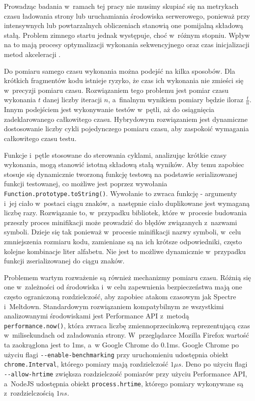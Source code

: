 Prowadząc badania w~ramach tej pracy nie musimy skupiać się na metrykach czasu ładowania strony lub uruchamiania środowiska serwerowego, ponieważ przy intensywnych lub powtarzalnych obliczeniach stanowią one pomijalną składową stałą.
Problem zimnego startu jednak występuje, choć w~różnym stopniu. Wpływ na to mają procesy optymalizacji wykonania sekwencyjnego oraz czas inicjalizacji metod akceleracji \cite{je-benchmarking}.

Do pomiaru samego czasu wykonania można podejść na kilka sposobów. Dla krótkich fragmentów kodu istnieje ryzyko, że czas ich wykonania nie zmieści się w~precyzji pomiaru czasu. Rozwiązaniem tego problemu jest pomiar czasu wykonania $t$ danej liczby iteracji $n$, a~finalnym wynikiem pomiary będzie iloraz $\frac{t}{n}$. Innym podejściem jest wykonywanie testów w~pętli, aż do osiągnięcia zadeklarowanego całkowitego czasu. Hybrydowym rozwiązaniem jest dynamiczne dostosowanie liczby cykli pojedynczego pomiaru czasu, aby zaspokoić wymagania całkowitego czasu testu.

Funkcje i~pętle stosowane do sterowania cyklami, analizując krótkie czasy wykonania, mogą stanowić istotną składową stałą wyników. Aby temu zapobiec stosuje się dynamicznie tworzoną funkcję testową na podstawie serializowanej funkcji testowanej, co możliwe jest poprzez wywołania \lstinline{Function.prototype.toString()}. Wywołanie to zwraca funkcję - argumenty i~jej ciało w~postaci ciągu znaków, a~następnie ciało duplikowane jest wymaganą liczbę razy. Rozwiązanie to, w~przypadku bibliotek, które w~procesie budowania przeszły proces minifikacji może prowadzić do błędów związanych z~nazwami symboli. Dzieje się tak ponieważ w~procesie minifikacji nazwy symboli, w~celu zmniejszenia rozmiaru kodu, zamieniane są na ich krótsze odpowiedniki, często kolejne kombinacje liter alfabetu. Nie jest to możliwe dynamicznie w~przypadku funkcji zserializowanej do ciągu znaków.

Problemem wartym rozważenie są również mechanizmy pomiaru czasu. Różnią się one w~zależności od środowiska i~w celu zapewnienia bezpieczeństwa mają one często ograniczoną rozdzielczość, aby zapobiec atakom czasowym jak Spectre i~Meltdown. Standardowym rozwiązaniem kompatybilnym ze wszystkimi analizowanymi środowiskami jest Performance API z~metodą \lstinline{performance.now()}, która zwraca liczbę zmiennoprzecinkową reprezentującą czas w~milisekundach od załadowania strony. W~przeglądarce Mozilla Firefox wartość ta zaokrąglona jest to 1ms, a~w Google Chrome do 0.1ms. Google Chrome po użyciu flagi \lstinline{--enable-benchmarking} przy uruchomieniu udostępnia obiekt \lstinline{chrome.Interval}, którego pomiary mają rozdzielczość $1 {\mu}s$. Deno po użyciu flagi \lstinline{--allow-hrtime} zwiększa rozdzielczość pomiarów przy użyciu Performance API, a~NodeJS udostępnia obiekt \lstinline{process.hrtime}, którego pomiary wykonywane są z~rozdzielczością $1ns$.

